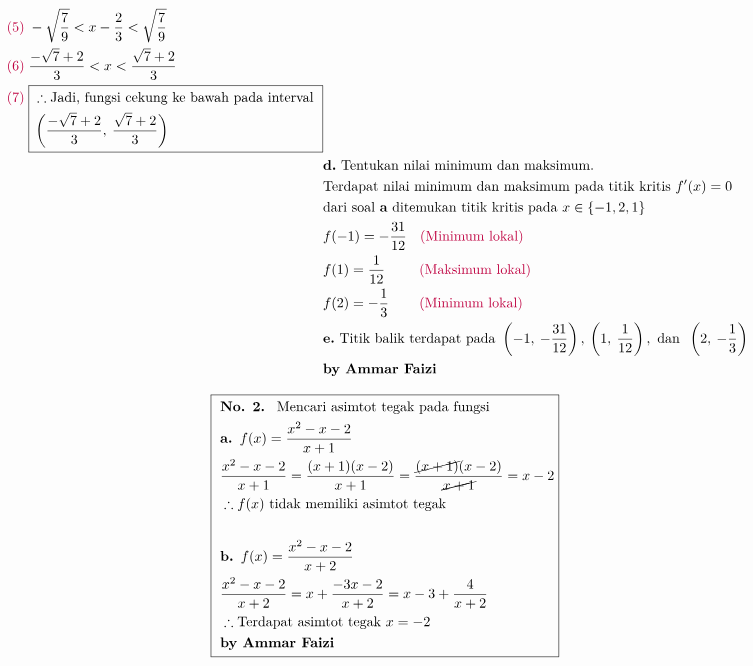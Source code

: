 \documentclass[13pt]{article}
\begin{document}
\begin{fleqn}[4em]
\begin{align*}
{\begin{aligned}
{\begin{aligned}[t]
    & {\color{purple}(5)}\; -\sqrt{\frac{7}{9}}<x-\frac{2}{3}<\sqrt{\frac{7}{9}} \\
    & {\color{purple}(6)}\; \frac{-\sqrt{7}+2}{3}<x<\frac{\sqrt{7}+2}{3} \\
    & {\color{purple}(7)}\; \boxed{
      \begin{aligned}[t]
        & \therefore \text{Jadi, fungsi cekung ke bawah pada interval } \\
        & \left(\frac{-\sqrt{7}+2}{3},\:\frac{\sqrt{7}+2}{3}\right)
      \end{aligned} 
    }
  \end{aligned}} \\
  & \textbf{d.} \text{ Tentukan nilai minimum dan maksimum.} \\
  & \text{Terdapat nilai minimum dan maksimum pada titik kritis } f'(x) = 0 \\
  & \text{dari soal } \textbf{a} \text{ ditemukan titik kritis pada } x \in \left\{-1, 2, 1\right\} \\
  & f(-1) = -\frac{31}{12}\:~\:\,\text{\color{purple} (Minimum lokal)}\\
  & f(1)  = \frac{1}{12}\:~\:~\:~\:~\:\text{\color{purple} (Maksimum lokal)}\\
  & f(2)  = -\frac{1}{3}\:~\:~\:~\:\;\text{\color{purple} (Minimum lokal)}\\
  & \textbf{e.} \text{ Titik balik terdapat pada } \left(-1,\:-\frac{31}{12}\right),\:\left(1,\:\frac{1}{12}\right), \text{ dan } \:\left(2,\:-\frac{1}{3}\right)
  \\ & \textbf{by Ammar Faizi}
\end{aligned}}
\end{align*}

\begin{align*}
\boxed{\begin{aligned}
  & \textbf{No. 2. } \text{ Mencari asimtot tegak pada fungsi } \\
  & \textbf{a. } f(x) = \frac{x^2 - x - 2}{x + 1} \\
  & \frac{x^2 - x - 2}{x + 1}
    = \frac{(x + 1)(x - 2)}{x + 1}
    = \frac{\cancel{(x + 1)}(x - 2)}{\cancel{x + 1}}
    = x - 2 \\
  & \therefore f(x) \text{ tidak memiliki asimtot tegak} \\ ~ \\
  & \textbf{b. } f(x) = \frac{x^2 - x - 2}{x + 2} \\
  & \frac{x^2 - x - 2}{x + 2} = x+\frac{-3x-2}{x+2} = x-3+\frac{4}{x+2} \\
  & \therefore \text{Terdapat asimtot tegak } x=-2
  \\ & \textbf{by Ammar Faizi}
\end{aligned}}
\end{align*}


\end{fleqn}
\end{document}
